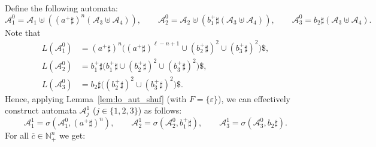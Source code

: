 \documentclass[envcountsame]{llncs}
\newcommand{\A}{\mathcal A}
\newcommand{\N}{\mathbb N}
\begin{document}
Define the following automata:
\[
    \A^0_1 = \A_1 \uplus ( (a^+\sharp)^n ( \A_3 \uplus \A_4 )), \qquad
    \A^0_2 = \A_2 \uplus (b_1^+ \sharp ( \A_3 \uplus \A_4 )), \qquad
    \A^0_3 = b_2 \sharp ( \A_3 \uplus \A_4).
\]
Note that
\begin{align*}
    L(\A^0_1) &= (a^+\sharp)^n \biggl( (a^+\sharp)^{\ell-n+1} \cup
    (b_2^+\sharp)^2  \cup (b_3^+\sharp)^2 \biggr) \$ , \\
    L(\A^0_2) &= b_1^+ \sharp \biggl( b_1^+ \sharp \cup (b_2^+\sharp)^2 \cup
    (b_3^+\sharp)^2\biggr)  \$ ,\\
    L(\A^0_3) &= b_2 \sharp \biggl((b_2^+\sharp)^2 \cup (b_3^+\sharp)^2 \biggr) \$ .
\end{align*}
Hence, applying Lemma~\ref{lem:lo_aut_shuf} (with $F=\{\varepsilon\}$), 
we can effectively construct automata $\A^1_j$ ($j\in \{1,2,3\}$) as follows:
\[
    \A^1_1 = \sigma( \A^0_1, (a^+\sharp)^n), \qquad \A^1_2 = \sigma(\A^0_2, b_1^+\sharp), \qquad \A^1_3 = \sigma(\A^0_3, b_2\sharp).
\]
For all $\overline{c}\in \N^n_+$ we get:
\end{document}
